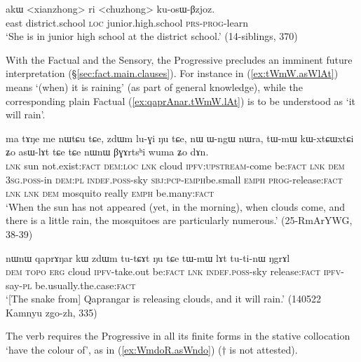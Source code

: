 \begin{exe}
\ex \label{ex:kosWBzjoz}
\gll  akɯ <xianzhong> ri <chuzhong> ku-osɯ-βzjoz. \\
east district.school \textsc{loc} junior.high.school \textsc{prs}-\textsc{prog}-learn \\
\glt `She is in junior high school at the district school.' (14-siblings, 370)
 \end{exe}

With the Factual and the Sensory, the Progressive precludes an imminent future interpretation (§\ref{sec:fact.main.clauses}).  For instance  in (\ref{ex:tWmW.asWlAt}) means `(when) it is raining' (as part of general knowledge), while the corresponding plain Factual  (\ref{ex:qaprAnar.tWmW.lAt}) is to be understood as `it will rain'.


\begin{exe}
\ex \label{ex:tWmW.asWlAt}
\gll ma tɤŋe me nɯtɕu tɕe, zdɯm lu-ɣi ŋu tɕe, nɯ ɯ-ngɯ nɯra, tɯ-mɯ kɯ-xtɕɯ\redp{}xtɕi ʑo asɯ-lɤt tɕe tɕe nɯnɯ βɣɤrtsʰi wuma ʑo dɤn. \\
\textsc{lnk} sun not.exist:\textsc{fact} \textsc{dem}:\textsc{loc} \textsc{lnk} cloud \textsc{ipfv}:\textsc{upstream}-come be:\textsc{fact} \textsc{lnk} \textsc{dem} \textsc{3sg}.\textsc{poss}-in \textsc{dem}:\textsc{pl} \textsc{indef}.\textsc{poss}-sky \textsc{sbj}:\textsc{pcp}-\textsc{emph}\redp{}be.small \textsc{emph} \textsc{prog}-release:\textsc{fact} \textsc{lnk} \textsc{lnk} \textsc{dem} mosquito really \textsc{emph} be.many:\textsc{fact} \\
\glt  `When the sun has not appeared (yet, in the morning), when clouds come, and there is a little rain, the mosquitoes are particularly numerous.' (25-RmArYWG, 38-39)
\end{exe}
 
\begin{exe}
\ex \label{ex:qaprAnar.tWmW.lAt}
\gll nɯnɯ qaprɤŋar kɯ zdɯm tu-tɕɤt ŋu tɕe tɯ-mɯ lɤt tu-ti-nɯ ŋgrɤl \\
\textsc{dem}  \textsc{topo} \textsc{erg} cloud \textsc{ipfv}-take.out be:\textsc{fact} \textsc{lnk} \textsc{indef}.\textsc{poss}-sky release:\textsc{fact} \textsc{ipfv}-say-\textsc{pl} be.usually.the.case:\textsc{fact} \\
\glt `[The snake from] Qaprangar is releasing clouds, and it will rain.' (140522 Kamnyu zgo-zh, 335)
\end{exe}

The verb  requires the Progressive in all its finite forms in the stative collocation  `have the colour of', as in (\ref{ex:WmdoR.asWndo}) ($\dagger$ is not attested).


